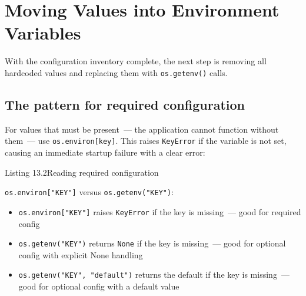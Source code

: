 \setcounter{section}{1}
\section{Moving Values into Environment Variables}\label{13-configuration-externalization:132-moving-values-into-environment-variables}

With the configuration inventory complete, the next step is removing all hardcoded values and replacing them with \texttt{os.getenv()} calls.

\subsection*{The pattern for required configuration}\label{13-configuration-externalization:the-pattern-for-required-configuration}

For values that must be present~--- the application cannot function without them~--- use \texttt{os.environ{[}key{]}}. This raises \texttt{KeyError} if the variable is not set, causing an immediate startup failure with a clear error:

\begin{codeboxcap}[short]{\textcolor{accent}{Listing 13.2}\enspace Reading required configuration}

\begin{Shaded}
\begin{Highlighting}[]

\OperatorTok{=}\NormalTok{ os.environ[}\NormalTok{]}

\OperatorTok{=}\NormalTok{ os.environ[}\NormalTok{]}
\end{Highlighting}
\end{Shaded}

\end{codeboxcap}

\noindent{}\texttt{os.environ{[}"KEY"{]}} versus \texttt{os.getenv("KEY")}:

\begin{itemize}
\tightlist
\item
  \texttt{os.environ{[}"KEY"{]}} raises \texttt{KeyError} if the key is missing~--- good for required config
\item
  \texttt{os.getenv("KEY")} returns \texttt{None} if the key is missing~--- good for optional config with explicit None handling
\item
  \texttt{os.}\allowbreak{}\texttt{getenv("KEY",}\allowbreak{}\texttt{\ "default")} returns the default if the key is missing~--- good for optional config with a default value
\end{itemize}

